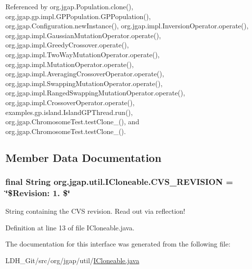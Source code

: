 Referenced by org.\-jgap.\-Population.\-clone(), org.\-jgap.\-gp.\-impl.\-G\-P\-Population.\-G\-P\-Population(), org.\-jgap.\-Configuration.\-new\-Instance(), org.\-jgap.\-impl.\-Inversion\-Operator.\-operate(), org.\-jgap.\-impl.\-Gaussian\-Mutation\-Operator.\-operate(), org.\-jgap.\-impl.\-Greedy\-Crossover.\-operate(), org.\-jgap.\-impl.\-Two\-Way\-Mutation\-Operator.\-operate(), org.\-jgap.\-impl.\-Mutation\-Operator.\-operate(), org.\-jgap.\-impl.\-Averaging\-Crossover\-Operator.\-operate(), org.\-jgap.\-impl.\-Swapping\-Mutation\-Operator.\-operate(), org.\-jgap.\-impl.\-Ranged\-Swapping\-Mutation\-Operator.\-operate(), org.\-jgap.\-impl.\-Crossover\-Operator.\-operate(), examples.\-gp.\-island.\-Island\-G\-P\-Thread.\-run(), org.\-jgap.\-Chromosome\-Test.\-test\-Clone\-\_(), and org.\-jgap.\-Chromosome\-Test.\-test\-Clone\-\_().



\subsection{Member Data Documentation}
\hypertarget{interfaceorg_1_1jgap_1_1util_1_1_i_cloneable_a4eaaa85432026f5bc54c3e520b22caa7}{
\subsubsection[{C\-V\-S\-\_\-\-R\-E\-V\-I\-S\-I\-O\-N}]{\setlength{\rightskip}{0pt plus 5cm}final String org.\-jgap.\-util.\-I\-Cloneable.\-C\-V\-S\-\_\-\-R\-E\-V\-I\-S\-I\-O\-N = \char`\"{}\$Revision\-: 1. \$\char`\"{}\hspace{0.3cm}{\ttfamily [static]}}}\label{interfaceorg_1_1jgap_1_1util_1_1_i_cloneable_a4eaaa85432026f5bc54c3e520b22caa7}
String containing the C\-V\-S revision. Read out via reflection! 

Definition at line 13 of file I\-Cloneable.\-java.



The documentation for this interface was generated from the following file\-:\begin{DoxyCompactItemize}
\item 
L\-D\-H\-\_\-\-Git/src/org/jgap/util/\hyperlink{_i_cloneable_8java}{I\-Cloneable.\-java}\end{DoxyCompactItemize}
